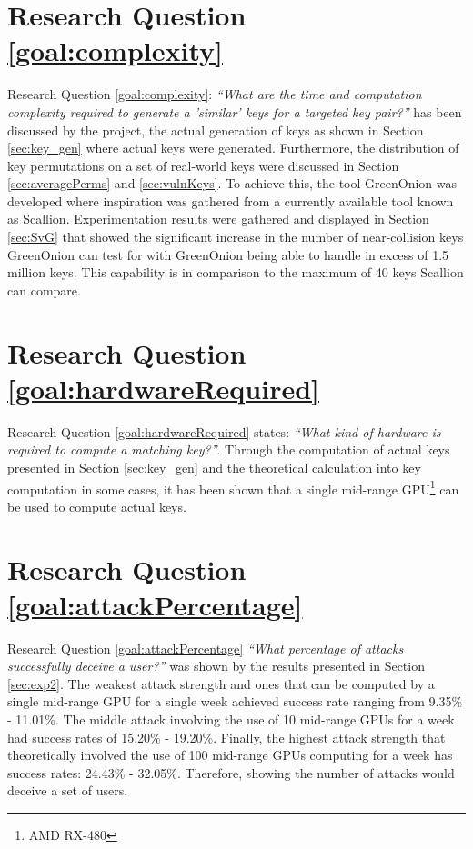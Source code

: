 \section{Research Question \ref{goal:complexity}}
Research Question \ref{goal:complexity}: \textit{``What are the time and computation complexity required to generate a ’similar’ keys for a targeted key pair?''} has been discussed by the project, the actual generation of keys as shown in Section \ref{sec:key_gen} where actual keys were generated. Furthermore, the distribution of key permutations on a set of real-world keys were discussed in Section \ref{sec:averagePerms} and \ref{sec:vulnKeys}. To achieve this, the tool GreenOnion was developed where inspiration was gathered from a currently available tool known as Scallion. Experimentation results were gathered and displayed in Section \ref{sec:SvG} that showed the significant increase in the number of near-collision keys GreenOnion can test for with GreenOnion being able to handle in excess of 1.5 million keys. This capability is in comparison to the maximum of 40 keys Scallion can compare.

\section{Research Question \ref{goal:hardwareRequired}}
Research Question \ref{goal:hardwareRequired} states: \textit{``What kind of hardware is required to compute a matching key?''}. Through the computation of actual keys presented in Section \ref{sec:key_gen} and the theoretical calculation into key computation in some cases, it has been shown that a single mid-range GPU\footnote{AMD RX-480} can be used to compute actual keys.

\section{Research Question \ref{goal:attackPercentage}}
Research Question \ref{goal:attackPercentage} \textit{``What percentage of attacks successfully deceive a user?''} was shown by the results presented in Section \ref{sec:exp2}. The weakest attack strength and ones that can be computed by a single mid-range GPU for a single week achieved success rate ranging from 9.35\% - 11.01\%. The middle attack involving the use of 10 mid-range GPUs for a week had success rates of 15.20\% - 19.20\%. Finally, the highest attack strength that theoretically involved the use of 100 mid-range GPUs computing for a week has success rates: 24.43\% - 32.05\%. Therefore, showing the number of attacks would deceive a set of users.


